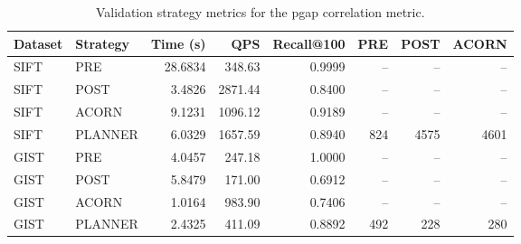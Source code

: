\begin{table}[H]
    \centering
    \renewcommand{\arraystretch}{1.12}
    \begin{tabular}{llrrrrrr}
        \toprule
        Dataset & Strategy & Time (s) & QPS & Recall@100 & PRE & POST & ACORN \\
        \midrule
        SIFT & PRE     & 28.6834 & 348.63  & 0.9999 & --  & --   & --   \\
        SIFT & POST    & 3.4826  & 2871.44 & 0.8400 & --  & --   & --   \\
        SIFT & ACORN   & 9.1231  & 1096.12 & 0.9189 & --  & --   & --   \\
        SIFT & PLANNER & 6.0329  & 1657.59 & 0.8940 & 824 & 4575 & 4601 \\
        \midrule
        GIST & PRE     & 4.0457  & 247.18  & 1.0000 & --  & --  & --  \\
        GIST & POST    & 5.8479  & 171.00  & 0.6912 & --  & --  & --  \\
        GIST & ACORN   & 1.0164  & 983.90  & 0.7406 & --  & --  & --  \\
        GIST & PLANNER & 2.4325  & 411.09  & 0.8892 & 492 & 228 & 280 \\
        \bottomrule
    \end{tabular}
    \caption{Validation strategy metrics for the pgap correlation metric.}
    \label{tab:validation-pgap}
\end{table}

\begin{table}[H]
    \centering
    \renewcommand{\arraystretch}{1.12}
    \caption{Planner diagnostics for \(c_{\mathrm{pgap}}\) on the validation sets.}
    \label{tab:validation-pgap-diagnostics}
\end{table}







